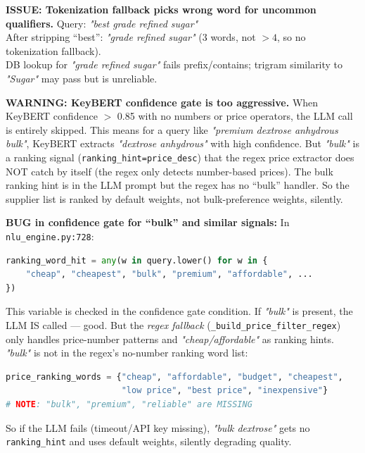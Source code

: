 \documentclass[12pt,a4paper]{article}
\begin{document}
\begin{issueBox}
\textbf{ISSUE: Tokenization fallback picks wrong word for uncommon qualifiers.}
Query: \textit{"best grade refined sugar"} \\
After stripping ``best'': \textit{"grade refined sugar"} (3 words, not $>4$, so no tokenization fallback). \\
DB lookup for \textit{"grade refined sugar"} fails prefix/contains; trigram similarity to \textit{"Sugar"}
may pass but is unreliable.
\end{issueBox}

\begin{warnBox}
\textbf{WARNING: KeyBERT confidence gate is too aggressive.}
When KeyBERT confidence $>$ 0.85 with no numbers or price operators, the LLM call is
entirely skipped. This means for a query like \textit{"premium dextrose anhydrous bulk"},
KeyBERT extracts \textit{"dextrose anhydrous"} with high confidence. But \textit{"bulk"} is a
ranking signal (\texttt{ranking\_hint=price\_desc}) that the regex price extractor does NOT
catch by itself (the regex only detects number-based prices). The bulk ranking hint is
in the LLM prompt but the regex has no ``bulk'' handler. So the supplier list is ranked
by default weights, not bulk-preference weights, silently.
\end{warnBox}

\begin{issueBox}
\textbf{BUG in confidence gate for ``bulk'' and similar signals:}
In \texttt{nlu\_engine.py:728}:
\begin{lstlisting}[language=Python]
ranking_word_hit = any(w in query.lower() for w in {
    "cheap", "cheapest", "bulk", "premium", "affordable", ...
})
\end{lstlisting}
This variable is checked in the confidence gate condition. If \textit{"bulk"} is present,
the LLM IS called --- good. But the \textit{regex fallback} (\texttt{\_build\_price\_filter\_regex})
only handles price-number patterns and \textit{"cheap/affordable"} as ranking hints.
\textit{"bulk"} is not in the regex's no-number ranking word list:
\begin{lstlisting}[language=Python]
price_ranking_words = {"cheap", "affordable", "budget", "cheapest",
                       "low price", "best price", "inexpensive"}
# NOTE: "bulk", "premium", "reliable" are MISSING
\end{lstlisting}
So if the LLM fails (timeout/API key missing), \textit{"bulk dextrose"} gets no
\texttt{ranking\_hint} and uses default weights, silently degrading quality.
\end{issueBox}
\end{document}
